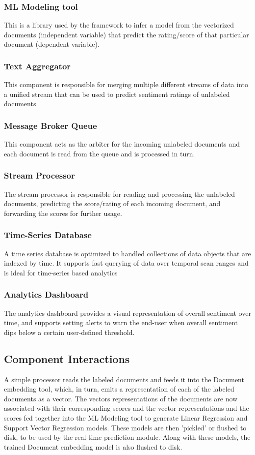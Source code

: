 \documentclass[conference]{IEEEtran}
\begin{document}
\subsubsection{ML Modeling tool}
This is a library used by the framework to infer a model from the vectorized documents (independent variable) that predict the rating/score of that particular document (dependent variable). 

\subsubsection{Text Aggregator}
This component is responsible for merging multiple different streams of data into a unified stream that can be used to predict sentiment ratings of unlabeled documents.

\subsubsection{Message Broker Queue}
This component acts as the arbiter for the incoming unlabeled documents and each document is read from the queue and is processed in turn.

\subsubsection{Stream Processor}
The stream processor is responsible for reading and processing the unlabeled documents, predicting the score/rating of each incoming document, and forwarding the scores for further usage.

\subsubsection{Time-Series Database}
A time series database is optimized to handled collections of data objects that are indexed by time. It supports fast querying of data over temporal scan ranges and is ideal for time-series based analytics

\subsubsection{Analytics Dashboard}
The analytics dashboard provides a visual representation of overall sentiment over time, and supports setting alerts to warn the end-user when overall sentiment dips below a certain user-defined threshold.

\subsection{Component Interactions} \label{Component Interactions}
A simple processor reads the labeled documents and feeds it into the Document embedding tool, which, in turn, emits a representation of each of the labeled documents as a vector. The vectors representations of the documents are now associated with their corresponding scores and the vector representations and the scores fed together into the ML Modeling tool to generate Linear Regression and Support Vector Regression models. These models are then 'pickled' or flushed to disk, to be used by the real-time prediction module. Along with these models, the trained Document embedding model is also flushed to disk.
\end{document}
